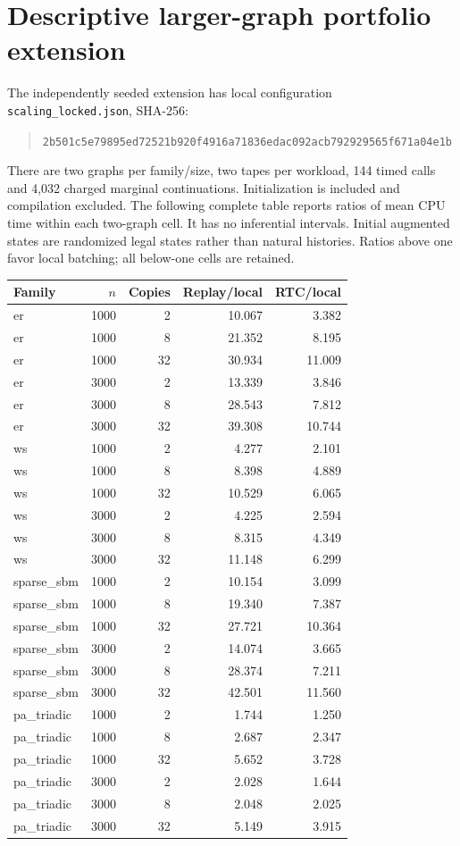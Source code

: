 \documentclass[preprint,11pt,sort&compress]{elsarticle}
\begin{document}
\FloatBarrier\section{Descriptive larger-graph portfolio extension}
The independently seeded extension has local configuration \texttt{scaling\_locked.json}, SHA-256:
\begin{quote}\footnotesize\texttt{2b501c5e79895ed72521b920f4916a71}\allowbreak\texttt{836edac092acb792929565f671a04e1b}\end{quote}
There are two graphs per family/size, two tapes per workload, 144 timed calls and 4,032 charged marginal continuations. Initialization is included and compilation excluded. The following complete table reports ratios of mean CPU time within each two-graph cell. It has no inferential intervals. Initial augmented states are randomized legal states rather than natural histories. Ratios above one favor local batching; all below-one cells are retained.

{\footnotesize\begin{longtable}{lrrrr}
\toprule Family & $n$ & Copies & Replay/local & RTC/local\\\midrule\endhead
er & 1000 & 2 & 10.067 & 3.382\\
er & 1000 & 8 & 21.352 & 8.195\\
er & 1000 & 32 & 30.934 & 11.009\\
er & 3000 & 2 & 13.339 & 3.846\\
er & 3000 & 8 & 28.543 & 7.812\\
er & 3000 & 32 & 39.308 & 10.744\\
ws & 1000 & 2 & 4.277 & 2.101\\
ws & 1000 & 8 & 8.398 & 4.889\\
ws & 1000 & 32 & 10.529 & 6.065\\
ws & 3000 & 2 & 4.225 & 2.594\\
ws & 3000 & 8 & 8.315 & 4.349\\
ws & 3000 & 32 & 11.148 & 6.299\\
sparse\_sbm & 1000 & 2 & 10.154 & 3.099\\
sparse\_sbm & 1000 & 8 & 19.340 & 7.387\\
sparse\_sbm & 1000 & 32 & 27.721 & 10.364\\
sparse\_sbm & 3000 & 2 & 14.074 & 3.665\\
sparse\_sbm & 3000 & 8 & 28.374 & 7.211\\
sparse\_sbm & 3000 & 32 & 42.501 & 11.560\\
pa\_triadic & 1000 & 2 & 1.744 & 1.250\\
pa\_triadic & 1000 & 8 & 2.687 & 2.347\\
pa\_triadic & 1000 & 32 & 5.652 & 3.728\\
pa\_triadic & 3000 & 2 & 2.028 & 1.644\\
pa\_triadic & 3000 & 8 & 2.048 & 2.025\\
pa\_triadic & 3000 & 32 & 5.149 & 3.915\\
\bottomrule\end{longtable}}
\end{document}
